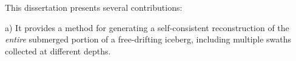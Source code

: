 %
%
%
%
%
This dissertation presents several contributions: 

a) It provides a method for generating a self-consistent reconstruction of the \emph{entire} submerged portion of a free-drifting iceberg, including multiple swaths collected at different depths. 

